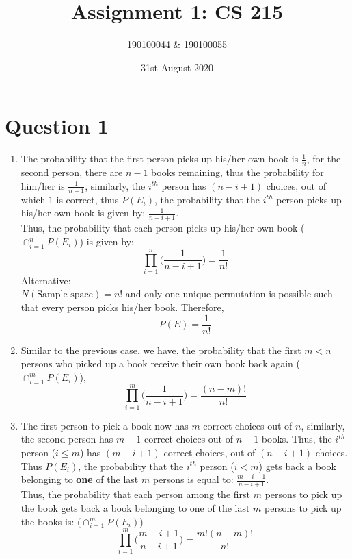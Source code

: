 \documentclass[11pt]{article}
\title{Assignment 1: CS 215}
\author{190100044 \& 190100055}
\date{31st August 2020}
\begin{document}
\maketitle
\tableofcontents
\thispagestyle{empty}

\newpage \setcounter{page}{1}
\section{Question 1}
\begin{enumerate}[label=(\alph*)]
    \item The probability that the first person picks up his/her own book is $\frac{1}{n}$, for the second person, there are $n-1$ books remaining, thus the probability for him/her is $\frac{1}{n-1}$, similarly, the $i^{th}$ person has $ (n-i+1) $ choices, out of which $1$ is correct, thus $P(E_i)$, the probability that the $i^{th}$ person picks up his/her own book is given by: $\frac{1}{n-i+1}$.\\
          Thus, the probability that each person picks up his/her own book ($ \cap_{i=1}^{n} P(E_i) $) is given by:
          $$ \prod_{i=1}^n \Big( \frac{1}{n-i+1} \Big) = \frac{1}{n!}$$
          Alternative:\\
          $N(\text{Sample space}) = n!$ and only one unique permutation is possible such that every person picks his/her book. Therefore,
          $$ P(E) = \frac{1}{n!} $$

    \item Similar to the previous case, we have, the probability that the first $ m < n $ persons who picked up a book receive their own book back again ($ \cap_{i=1}^{m} P(E_i) $),
          $$ \prod_{i=1}^m \Big( \frac{1}{n-i+1} \Big) = \frac{(n-m)!}{n!} $$

    \item The first person to pick a book now has $m$ correct choices out of $n$, similarly, the second person has $m-1$ correct choices out of $n-1$ books. Thus, the $i^{th}$ person ($ i \le m $) has $ (m-i+1) $ correct choices, out of $(n-i+1)$ choices. Thus $P(E_i)$, the probability that the $i^{th}$ person ($i < m$) gets back a book belonging to \textbf{one} of the last $m$ persons is equal to: $\frac{m-i+1}{n-i+1}$.\\
          Thus, the probability that each person among the first $m$ persons to pick up the book gets back a book belonging to one of the last $m$ persons to pick up the books is: ($ \cap_{i=1}^{m} P(E_i) $)
          $$ \prod_{i=1}^m \Big( \frac{m-i+1}{n-i+1} \Big) = \frac{m!(n-m)!}{n!} $$


\end{enumerate}
\end{document}
